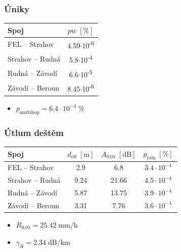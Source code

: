 \documentclass[aspectratio=169, 12pt, hyperref={unicode}]{beamer}
\begin{document}
\begin{frame}
\frametitle{Úniky}
\begin{table}[ht]
		\centering	
		\begin{tabular}[t]{|l||c|}
			\hline
			Spoj & $pw \; [\text{\%}]$\\
			\hline\hline
			FEL -- Strahov & 4.59$\cdot$10\textsuperscript{-6}\\  
			\hline
			Strahov -- Rudná & 5.8$\cdot$10\textsuperscript{-4}\\
			\hline
			Rudná -- Závodí & 6.6$\cdot$10\textsuperscript{-5}\\
			\hline
			Závodí -- Beroun & 8.45$\cdot$10\textsuperscript{-6}\\
			\hline
		\end{tabular}
	\end{table}
	\begin{itemize}
		\item $p_{\text{multihop}} = 6.4 \cdot 10^{-4} \; \text{\%}$
	\end{itemize}
\end{frame}

\begin{frame}
\frametitle{Útlum deštěm}
	\begin{table}[h!]
		\centering
		\begin{tabular}{| l || c | c | c |}
			\hline
			Spoj & $d_{\text{eff}} \; [\text{m}]$ & $A_{0.01} \; [\text{dB}]$ & $p_{\mathrm{rain}} \; [\%]$\\
			\hline\hline
			FEL -- Strahov & 2.9 & 6.8 & $3.4 \cdot 10^{-4}$\\
			\hline
			Strahov -- Rudná & 9.24 & 21.66 & $4.5 \cdot 10^{-4}$\\
			\hline
			Rudná -- Závodí & 5.87 & 13.75 & $3.9 \cdot 10^{-4}$\\
			\hline
			Závodí -- Beroun & 3.31 & 7.76 & $3.6 \cdot 10^{-4}$\\
			\hline
		\end{tabular}
	\end{table}
	\begin{itemize}
		\item $R_{0.01} = 25.42 \;\text{mm/h}$
		\item $\gamma_R = 2.34 \;\text{dB/km}$
	\end{itemize}
\end{frame}

\end{document}
